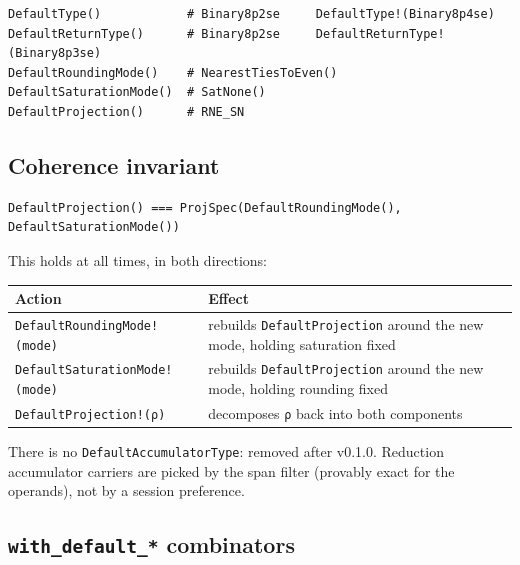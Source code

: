 \begin{verbatim}
DefaultType()            # Binary8p2se     DefaultType!(Binary8p4se)
DefaultReturnType()      # Binary8p2se     DefaultReturnType!(Binary8p3se)
DefaultRoundingMode()    # NearestTiesToEven()
DefaultSaturationMode()  # SatNone()
DefaultProjection()      # RNE_SN
\end{verbatim}



\subsection{Coherence invariant}



\label{2615016547748953455}{}



\begin{verbatim}
DefaultProjection() === ProjSpec(DefaultRoundingMode(), DefaultSaturationMode())
\end{verbatim}



This holds at all times, in both directions:




\begin{table}[h]
\centering
\begin{tabulary}{\linewidth}{L L}
\toprule
Action & Effect \\
\toprule
\texttt{DefaultRoundingMode!(\allowbreak{}mode)} & rebuilds \texttt{DefaultProjection} around the new mode, holding saturation fixed \\
\texttt{DefaultSaturationMode!(\allowbreak{}mode)} & rebuilds \texttt{DefaultProjection} around the new mode, holding rounding fixed \\
\texttt{DefaultProjection!(ρ)} & decomposes \texttt{ρ} back into both components \\
\bottomrule
\end{tabulary}

\end{table}



There is no \texttt{DefaultAccumulatorType}: removed after v0.1.0. Reduction accumulator carriers are picked by the span filter (provably exact for the operands), not by a session preference.



\subsection{\texttt{with\_\allowbreak{}default\_\allowbreak{}*} combinators}



